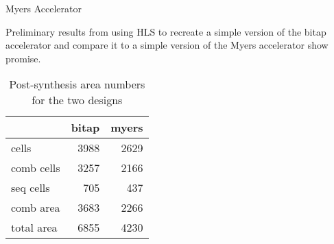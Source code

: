 \documentclass{cbxposter}
\renewcommand{\smallskip}{\vspace{0.16667in}}
\begin{document}
\begin{frame}[fragile,t]{}
\begin{columns}[T]
\begin{column}{10.5in}
\vspace{0.67in}
\begin{block}{Myers Accelerator}
  \smallskip

  Preliminary results from using HLS to recreate a simple version of the bitap
  accelerator and compare it to a simple version of the Myers accelerator show
  promise.

  \begin{table}
  \begin{tabular}{l|r|r}
               & bitap & myers \\
    \hline
    cells      & 3988  & 2629  \\
    comb cells & 3257  & 2166  \\
    seq cells  & 705   & 437   \\
    comb area  & 3683  & 2266  \\
    total area & 6855  & 4230  \\
  \end{tabular}
  \caption{Post-synthesis area numbers for the two designs}
\end{table}

  
\end{block}

\end{column}













\end{columns}
\end{frame}
\end{document}
